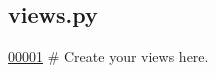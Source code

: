 \hypertarget{views_8py_source}{}\subsection{views.\+py}
\label{views_8py_source}

\begin{DoxyCode}
\hypertarget{views_8py_source_l00001}{}\hyperlink{namespaceBuilding_1_1views}{00001} \textcolor{comment}{# Create your views here.}
\end{DoxyCode}
